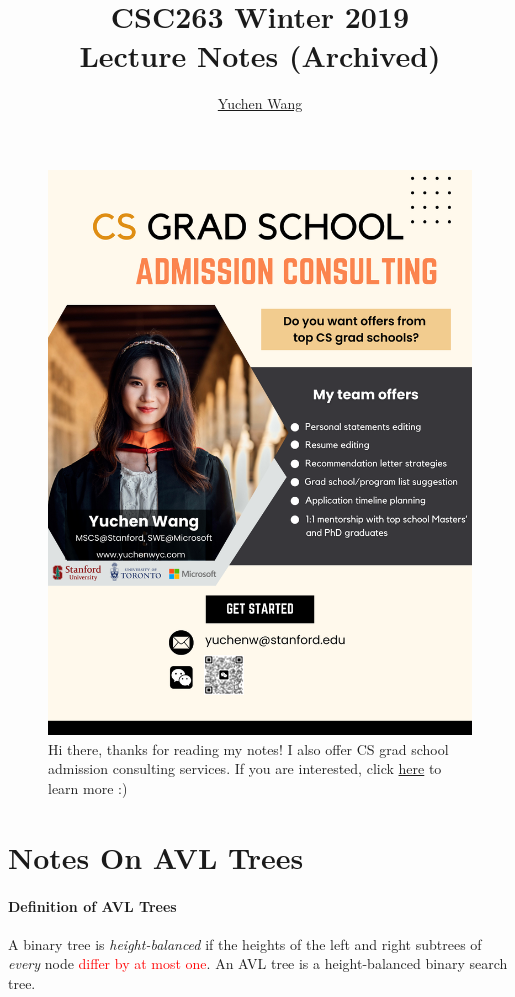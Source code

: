 \documentclass[11pt]{article}
\title{CSC263 Winter 2019\\ Lecture Notes (Archived)}
\author{\textcolor{blue}{\href{https://www.yuchenwyc.com}{Yuchen Wang}}}
\newcommand{\ti}[1]{\textit{#1}}
\begin{document}
	\maketitle
	\tableofcontents
	\newpage
	\begin{figure}[h]
	\centering
	\includegraphics[scale=0.21]{../ad.png}
	\caption{Hi there, thanks for reading my notes! I also offer CS grad school admission consulting services. If you are interested, click \textcolor{blue}{\href{https://www.yuchenwyc.com/files/admission_consulting.pdf}{here}} to learn more :)}
\end{figure}
	\section{Notes On AVL Trees}
	\paragraph{Definition of AVL Trees} A binary tree is \ti{height-balanced} if the heights of the left and right subtrees of \ti{every} node \textcolor{red}{differ by at most one}. An AVL tree is a height-balanced binary search tree.
\end{document}
